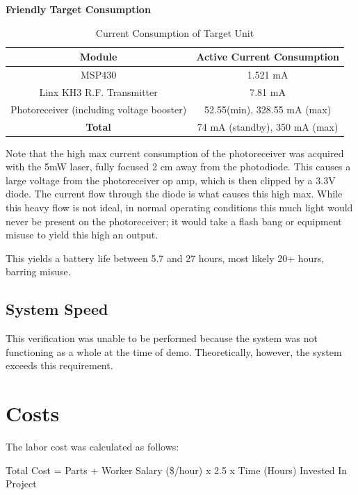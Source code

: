 \documentclass[letterpaper,10pt]{article}
\begin{document}
\begin{spacing}{1.15}
\hspace{5mm}\textbf{Friendly Target Consumption} \label{section:ttarget-consumption}
\begin{table}[H]
	\centering
	\begin{tabular}{c|c}	%
		\toprule	%
		Module & Active Current Consumption \\
		\midrule
		MSP430 & 1.521 mA \\ 
		Linx KH3 R.F. Transmitter & 7.81 mA\\
		Photoreceiver (including voltage booster) & 52.55(min), 328.55 mA (max)\\
		\bottomrule	%
		\textbf{Total} & 74 mA (standby), 350 mA (max) \\
	\end{tabular}%
	\caption{Current Consumption of Target Unit}
	\label{tab:table2}	%
\end{table}%

Note that the high max current consumption of the photoreceiver was acquired with the 5mW laser, fully focused 2 cm away from the photodiode. This causes a large voltage from the photoreceiver op amp, which is then clipped by a 3.3V diode. The current flow through the diode is what causes this high max. While this heavy flow is not ideal, in normal operating conditions this much light would never be present on the photoreceiver; it would take a flash bang or equipment misuse to yield this high an output. 

This yields a battery life between 5.7 and 27 hours, most likely 20+ hours, barring misuse. 

\subsection{System Speed}

This verification was unable to be performed because the system was not functioning as a whole at the time of demo. Theoretically, however, the system exceeds this requirement. 

\section{Costs}

The labor cost was calculated as follows:

\begin{center}
	Total Cost = Parts + Worker Salary (\$/hour) x 2.5 x Time (Hours) Invested In Project
\end{center}


\end{spacing}
\end{document}

